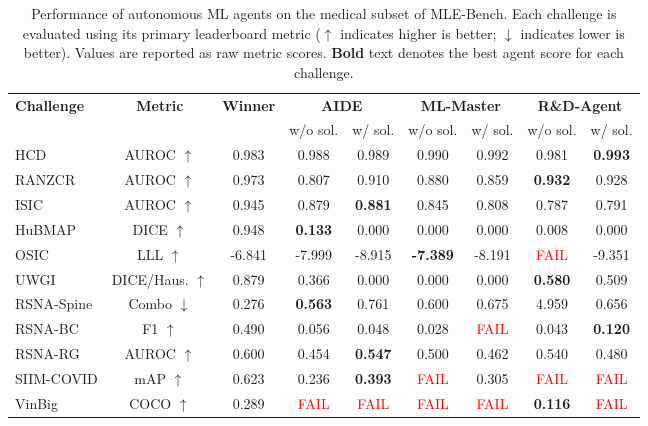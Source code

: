 \documentclass{midl} %
\begin{document}
\begin{table}[t]
\centering
\footnotesize	
\caption{Performance of autonomous ML agents on the medical subset of MLE-Bench. 
Each challenge is evaluated using its primary leaderboard metric ($\uparrow$ indicates higher is better; $\downarrow$ indicates lower is better). 
Values are reported as raw metric scores. 
\textbf{Bold} text denotes the best agent score for each challenge.}
\label{tab:mlebench_medical_summary}
\begin{tabular}{lcccccccc}
\toprule
\textbf{Challenge} &
\textbf{Metric} &
\textbf{Winner} &
\multicolumn{2}{c}{\textbf{AIDE}} &
\multicolumn{2}{c}{\textbf{ML-Master}} &
\multicolumn{2}{c}{\textbf{R\&D-Agent}} \\
\cmidrule(lr){4-5} \cmidrule(lr){6-7} \cmidrule(lr){8-9}
& & & w/o sol. & w/ sol. & w/o sol. & w/ sol. & w/o sol. & w/ sol. \\
\midrule
HCD & AUROC $\uparrow$ & 0.983 & 0.988 & 0.989 &  0.990 & 0.992 & 0.981 & \textbf{0.993} \\
RANZCR & AUROC $\uparrow$ & 0.973 & 0.807 & 0.910  & 0.880  & 0.859  & \textbf{0.932} & 0.928 \\
ISIC & AUROC $\uparrow$ & 0.945 & 0.879 & \textbf{0.881}  & 0.845  & 0.808 & 0.787 & 0.791 \\
HuBMAP & DICE $\uparrow$& 0.948 & \textbf{0.133} & 0.000  & 0.000  & 0.000 & 0.008 & 0.000 \\
OSIC & LLL $\uparrow$& -6.841 & -7.999 & -8.915  & \textbf{-7.389}  & -8.191 & \textcolor{red}{FAIL} & -9.351 \\
UWGI & DICE/Haus. $\uparrow$& 0.879 & 0.366 & 0.000  & 0.000  & 0.000 & \textbf{0.580} & 0.509 \\
RSNA-Spine & Combo $\downarrow$& 0.276 & \textbf{0.563} & 0.761  & 0.600  & 0.675 & 4.959 & 0.656 \\
RSNA-BC & F1 $\uparrow$& 0.490 & 0.056 & 0.048  & 0.028  & \textcolor{red}{FAIL} & 0.043 & \textbf{0.120} \\
RSNA-RG & AUROC $\uparrow$& 0.600 & 0.454 & \textbf{0.547}  & 0.500  & 0.462 & 0.540 & 0.480 \\
SIIM-COVID & mAP $\uparrow$& 0.623 & 0.236 & \textbf{0.393}  &  \textcolor{red}{FAIL}  & 0.305 &\textcolor{red}{FAIL} & \textcolor{red}{FAIL} \\
VinBig & COCO $\uparrow$& 0.289 & \textcolor{red}{FAIL} & \textcolor{red}{FAIL}  & \textcolor{red}{FAIL}  & \textcolor{red}{FAIL} & \textbf{0.116} & \textcolor{red}{FAIL} \\
\bottomrule
\end{tabular}
\end{table}
\end{document}
